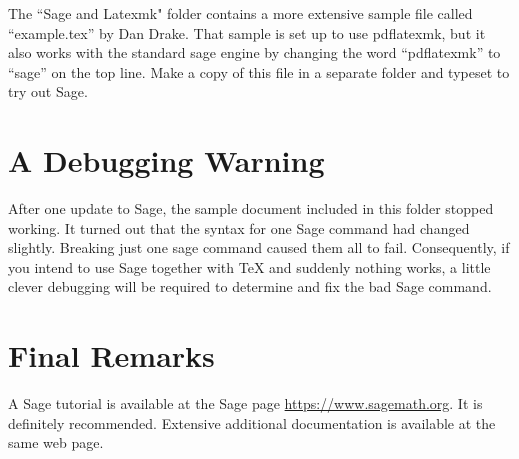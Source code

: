 \documentclass[11pt, oneside]{amsart}
\begin{document}
The ``Sage and Latexmk" folder contains a more extensive sample file called ``example.tex'' by Dan Drake. That sample is set up to use pdflatexmk, but it also works with the standard sage engine by changing the word ``pdflatexmk'' to ``sage'' on the top line.
Make a copy of this file in a separate folder and typeset to try out Sage.


\section{A Debugging Warning}

After one update to Sage, the sample document included in this folder stopped working. It turned out that the syntax for one Sage command had changed slightly. Breaking just one sage command caused them all to fail. Consequently, if you intend to use Sage together with TeX and suddenly nothing works, a little clever debugging will be required to determine and fix the bad Sage command.



\section{Final Remarks}
 
A Sage tutorial is available at the Sage page \url{https://www.sagemath.org}. It is definitely recommended. Extensive additional documentation is available at the same web page.
\end{document}
